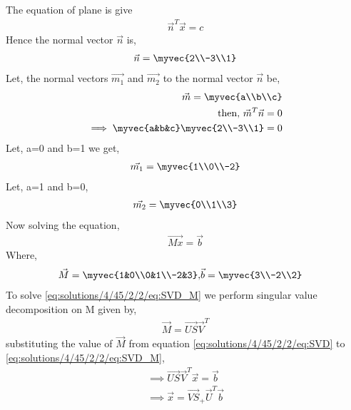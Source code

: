 The equation of plane is give 
\begin{align}
\vec{n}^T\vec{x} = c
\end{align}
Hence the normal vector $\vec{n}$ is,
\begin{align}
\vec{n} = \myvec{2\\-3\\1}
\end{align}
Let, the normal vectors $\vec{m_1}$ and $\vec{m_2}$ to the normal vector $\vec{n}$ be, 
\begin{align}
\vec{m} = \myvec{a\\b\\c}\\
\mbox{then, } \vec{m}^T\vec{n} = 0\\
\implies \myvec{a&b&c}\myvec{2\\-3\\1} = 0
\end{align}  
Let, a=0 and b=1 we get,
\begin{align}
\vec{m_1} = \myvec{1\\0\\-2}
\end{align}
Let, a=1 and b=0,
\begin{align}
\vec{m_2} = \myvec{0\\1\\3}
\end{align}
Now solving the equation,
\begin{align}
\vec{Mx} = \vec{b}
\label{eq:solutions/4/45/2/2/eq:SVD_M}
\end{align}
Where,
\begin{align}
\vec{M} = \myvec{1&0\\0&1\\-2&3} , & \vec{b} = \myvec{3\\-2\\2}\label{eq:solutions/4/45/2/2/eq:b}
\end{align}
To solve \eqref{eq:solutions/4/45/2/2/eq:SVD_M} we perform singular value decomposition on M given by, 
\begin{align}
\vec{M} = \vec{US}\vec{V}^T
\label{eq:solutions/4/45/2/2/eq:SVD}
\end{align}
substituting the value of $\vec{M}$ from equation \eqref{eq:solutions/4/45/2/2/eq:SVD} to \eqref{eq:solutions/4/45/2/2/eq:SVD_M},
\begin{align}
\implies \vec{US}\vec{V}^T\vec{x} = \vec{b}\\
\implies \vec{x} = \vec{VS}_+\vec{U}^T\vec{b} \label{eq:solutions/4/45/2/2/eq:x}
\end{align}
